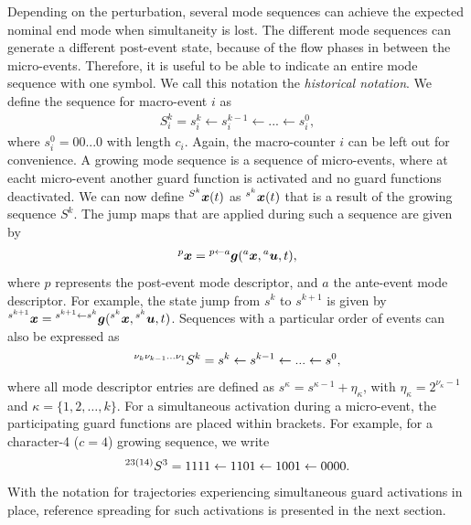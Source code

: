 \documentclass[../DC2017114Bouma.tex]{subfiles}
\begin{document}
Depending on the perturbation, several mode sequences can achieve the expected nominal end mode when simultaneity is lost. The different mode sequences can generate a different post-event state, because of the flow phases in between the micro-events. Therefore, it is useful to be able to indicate an entire mode sequence with one symbol. We call this notation the \textit{historical notation}. We define the sequence for macro-event $i$ as 
\begin{align}
S^k_i = s^k_i\leftarrow s^{k-1}_i\leftarrow ... \leftarrow s^0_i,
\end{align}
where $s^0_i = 00...0$ with length $c_i$. Again, the macro-counter $i$ can be left out for convenience. A growing mode sequence is a sequence of micro-events, where at eacht micro-event another guard function is activated and no guard functions deactivated. We can now define $\hspace{0cm}^{S^k}{\boldsymbol{x}}(t)$ as $\hspace{0cm}^{s^k}{\boldsymbol{x}}(t)$ that is a result of the growing sequence $S^k$. The jump maps that are applied during such a sequence are given by
\begin{align}
\hspace{0cm}^{p}{\boldsymbol{x}} = \hspace{0cm}^{p\leftarrow a}{\boldsymbol{g}}(\hspace{0cm}^{a}{\boldsymbol{x}},\hspace{0cm}^{a}{\boldsymbol{u}},t),
\end{align}
where $p$ represents the post-event mode descriptor, and $a$ the ante-event mode descriptor. For example, the state jump from $s^k$ to $s^{k+1}$ is given by $\hspace{0cm}^{s^{k+1}}{\boldsymbol{x}} = \hspace{0cm}^{s^{k+1}\leftarrow s^k}{\boldsymbol{g}}(\hspace{0cm}^{s^k}{\boldsymbol{x}},\hspace{0cm}^{s^k}{\boldsymbol{u}},t)$. Sequences with a particular order of events can also be expressed as
\begin{align}
\hspace{0cm}^{\nu_k \nu_{k-1}...\nu_{1}}S^k = s^k \leftarrow s^{k-1} \leftarrow ... \leftarrow s^0,
\end{align}
where all mode descriptor entries are defined as $s^{\kappa} = s^{\kappa-1} + \eta_{\kappa}$, with $\eta_{\kappa} = 2^{\nu_{\kappa}-1}$ and $\kappa = \{1,2,\dots,k\}$. For a simultaneous activation during a micro-event, the participating guard functions are placed within brackets. For example, for a character-4 ($c = 4$) growing sequence, we write 
\begin{align}
\hspace{0cm}^{23(14)}S^3 = 1111 \leftarrow 1101 \leftarrow 1001 \leftarrow 0000.
\end{align}
%
With the notation for trajectories experiencing simultaneous guard activations in place, reference spreading for such activations is presented in the next section.
\end{document}

